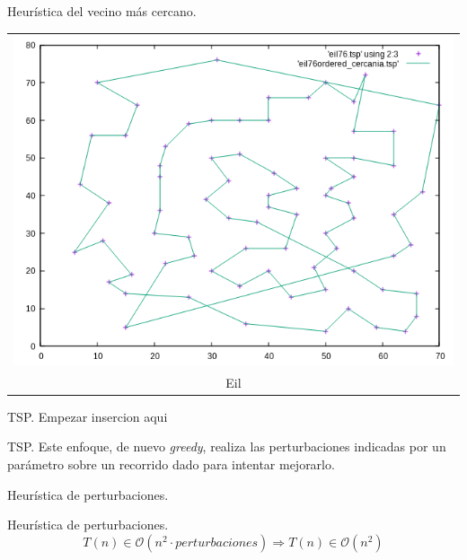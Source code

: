 \documentclass[10pt, xcolor=table]{beamer}
\begin{document}
\begin{frame}[fragile]{Heurística del vecino más cercano. }
\begin{center}
\begin{tabular}{c}
\includegraphics[scale=0.23]{./Images/eil_cercania.png} \\
Eil
\end{tabular}
\end{center}
\end{frame}

\begin{frame}[fragile]{TSP. }
Empezar insercion aqui
\end{frame}

\begin{frame}[fragile]{TSP. }
Este enfoque, de nuevo \textit{greedy}, realiza las perturbaciones indicadas por un parámetro sobre un recorrido dado para intentar mejorarlo. 
\end{frame}

\begin{frame}[fragile]{Heurística de perturbaciones. }
\begin{center}
\scalebox{0.7}{

}
\end{center}
\end{frame}

\begin{frame}[fragile]{Heurística de perturbaciones. }
\[
	T(n) \in \mathcal{O}(n^2 \cdot perturbaciones) \Rightarrow T(n) \in \mathcal{O}(n^2)
\]
\end{frame}
\end{document}
